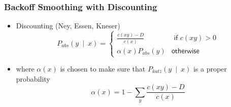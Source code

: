 \begin{frame}
\frametitle{Backoff Smoothing with Discounting}
\begin{itemize}[<+->]
\item Discounting (Ney, Essen, Kneser)
\[ P_{\textit{abs}}(y~\mid~x) = \left\{ 
\begin{array}{cc}
\frac{ c(xy) - D }{ c(x) } & \textsf{ if $c(xy) > 0$} \\
\alpha(x) P_{\textit{abs}} (y) & \textsf{otherwise}
\end{array}
\right. \]
\item where $\alpha(x)$ is chosen to make sure that $P_{\textit{katz}}(y~\mid~x)$ is a proper probability
\[ \alpha(x) = 1 - \sum_y \frac{ c(xy) - D }{ c(x) } \]
\end{itemize}
\end{frame}

